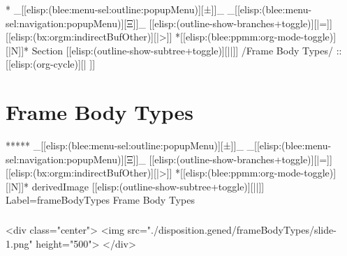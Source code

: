 \begin{whenOrg}
\begin{verblatex}
\begin{frame}[fragile,label=frameControlTypes]


\end{frame}
\end{verblatex}


\begin{whenOrg}
*  _[[elisp:(blee:menu-sel:outline:popupMenu)][±]]_ _[[elisp:(blee:menu-sel:navigation:popupMenu)][Ξ]]_ [[elisp:(outline-show-branches+toggle)][|=]] [[elisp:(bx:orgm:indirectBufOther)][|>]] *[[elisp:(blee:ppmm:org-mode-toggle)][|N]]*  Section    [[elisp:(outline-show-subtree+toggle)][||]]   /Frame Body Types/ ::  [[elisp:(org-cycle)][| ]]
\end{whenOrg}

\section{Frame Body Types}

\begin{whenOrg}
*****  _[[elisp:(blee:menu-sel:outline:popupMenu)][±]]_ _[[elisp:(blee:menu-sel:navigation:popupMenu)][Ξ]]_ [[elisp:(outline-show-branches+toggle)][|=]] [[elisp:(bx:orgm:indirectBufOther)][|>]] *[[elisp:(blee:ppmm:org-mode-toggle)][|N]]*  derivedImage [[elisp:(outline-show-subtree+toggle)][||]] Label=frameBodyTypes Frame Body Types
\end{whenOrg}

\begin{htmlonly}

\begin{frame}[fragile,plain,label=frameBodyTypes]
    \frametitle{}
    \framesubtitle{}
    \begin{rawhtml}
<div class="center">
<img src="./disposition.gened/frameBodyTypes/slide-1.png" height="500">
</div>
    \end{rawhtml}
\end{frame}
\end{htmlonly}


\end{whenOrg}
